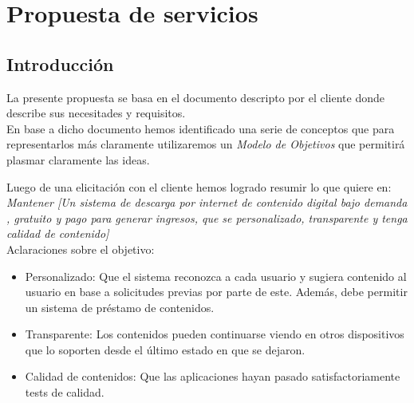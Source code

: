 \documentclass[11pt, a4paper, spanish]{article}
\newenvironment{borde}[1]
{\begin{lrbox}{\fmbox}\begin{minipage}{#1}}
{\end{minipage}\end{lrbox}\fbox{\usebox{\fmbox}}\\[10pt]}
\begin{document}
	



\section{Propuesta de servicios}
\label{sec:Propuesta de servicios}

\subsection{Introducci\'on}

	La presente propuesta se basa en el documento descripto por el cliente donde describe sus necesitades y requisitos.\\

	En base a dicho documento hemos identificado una serie de conceptos que para representarlos m\'as claramente utilizaremos un \emph{Modelo de Objetivos} que permitir\'a plasmar claramente las ideas.

	Luego de una elicitaci\'on con el cliente hemos logrado resumir lo que quiere en: \\

	\emph{Mantener [Un sistema de descarga por internet de contenido digital bajo demanda , gratuito y pago para generar ingresos, que se personalizado, transparente y tenga calidad de contenido]}
	\\
	Aclaraciones sobre el objetivo:\\
\begin{itemize}
	
\item {Personalizado: Que el sistema reconozca a cada usuario y  sugiera contenido al usuario en base a solicitudes previas por parte de este.
Adem\'as, debe permitir un sistema de pr\'estamo de contenidos.}
\item {Transparente: Los contenidos pueden continuarse viendo en otros dispositivos que lo soporten desde el \'ultimo estado en que se dejaron.}
\item {Calidad de contenidos: Que las aplicaciones hayan pasado satisfactoriamente tests de calidad.} 
\end{itemize}
\newpage
	
\end{document}
